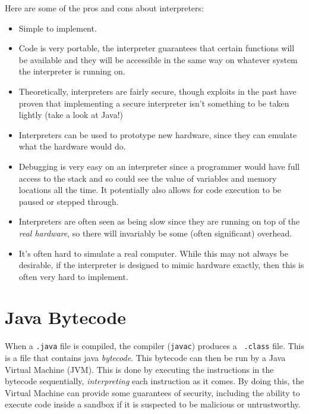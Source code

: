 Here are some of the pros and cons about interpreters:

\begin{itemize}
	\item Simple to implement.
	
	\item Code is very portable, the interpreter guarantees that certain
	functions will be available and they will be accessible in the same way
	on whatever system the interpreter is running on.

	\item Theoretically, interpreters are fairly secure, though exploits in the
	past have proven that implementing a secure interpreter isn't something to
	be taken lightly (take a look at Java!)

	\item Interpreters can be used to prototype new hardware, since they can
	emulate what the hardware would do.

	\item Debugging is very easy on an interpreter since a programmer would have
	full access to the stack and so could see the value of variables and memory
	locations all the time. It potentially also allows for code execution to be
	paused or stepped through.

	\item Interpreters are often seen as being slow since they are running on
	top of the {\it real hardware}, so there will invariably be some (often
	significant) overhead.

	\item It's often hard to simulate a real computer. While this may not always
	be desirable, if the interpreter is designed to mimic hardware exactly,
	then this is often very hard to implement.
\end{itemize}

\section{Java Bytecode}

When a {\tt .java} file is compiled, the compiler ({\tt javac}) produces a {\tt
.class} file. This is a file that contains java {\it bytecode}. This bytecode
can then be run by a Java Virtual Machine (JVM). This is done by executing the
instructions in the bytecode sequentially, {\it interpreting} each instruction
as it comes. By doing this, the Virtual Machine can provide some guarantees of
security, including the ability to execute code inside a sandbox if it is
suspected to be malicious or untrustworthy.

